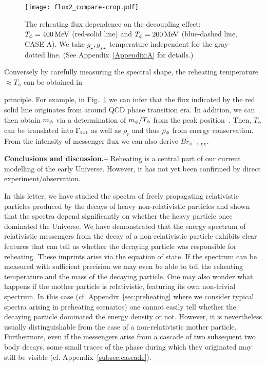 \documentclass[superscriptaddress,aps,preprintnumbers,amsmath,showpacs,amssymb,prd,nofootinbib,reprint]{revtex4-1}
\begin{document}
\begin{figure}[t!]
\begin{center}  
\texttt{[image: flux2\_compare-crop.pdf]}
\end{center}
\caption{The reheating flux dependence on the decoupling effect:  $T_\phi=400{\rm \, MeV}$ (red-solid line) and $T_\phi=200{\rm \, MeV}$ (blue-dashed line, CASE A). We take $g_\star,g_{s \star}$ temperature independent for the gray-dotted line. (See Appendix~\ref{Appendix:A} for details.)  }
\label{fig:flux_compare}
\end{figure} 
Conversely by carefully measuring the spectral shape, 
the reheating temperature $\approx T_\phi$ can be obtained in {principle. For example, in Fig.~\ref{fig:flux_compare} we can infer that the flux indicated by the red solid line originates from around QCD phase transition era. 
In addition, we can then obtain $m_\phi$ via a determination of $m_\phi/T_{\phi}$ from the peak position~\cite{Jaeckel:2020oet}. Then, $T_\phi$ can be translated into $\Gamma_{\rm tot}$ as well as $\rho_r$ and thus $\rho_\phi$ from energy conservation. From the intensity of messenger flux we can also derive $Br_{\phi \to \chi\chi}$. 



\vspace{0.2cm}
{\bf Conclusions and discussion.--}\label{sec:conclusions}
Reheating is a central part of our current modelling of the early Universe.
However, it has not yet been confirmed by  direct experiment/observation. 

In this letter, we have studied the spectra of freely propagating relativistic particles produced by the decays of heavy non-relativistic particles and shown that the spectra depend significantly on whether the heavy particle once dominated the Universe. 
We have demonstrated that the energy spectrum of relativistic messengers from the decay of a non-relativistic particle exhibits clear features that can tell us whether the decaying particle was responsible for reheating. These imprints arise via the equation of state. If the spectrum can be measured with sufficient precision we may even be able to tell the reheating temperature and the mass of the decaying particle. 
One may also wonder what happens if the mother particle is relativistic, featuring its own non-trivial spectrum. In this case (cf. Appendix~\ref{sec:preheating} where we consider typical spectra arising in preheating scenarios) one cannot easily tell whether the decaying particle dominated the energy density or not. However, 
it is nevertheless usually distinguishable from the case of a non-relativistic mother particle. Furthermore, even if the messengers arise from a cascade of two subsequent two body decays, some small traces of the phase during which they originated may still be visible (cf. Appendix~\ref{subsec:cascade}). 

}
\end{document}
